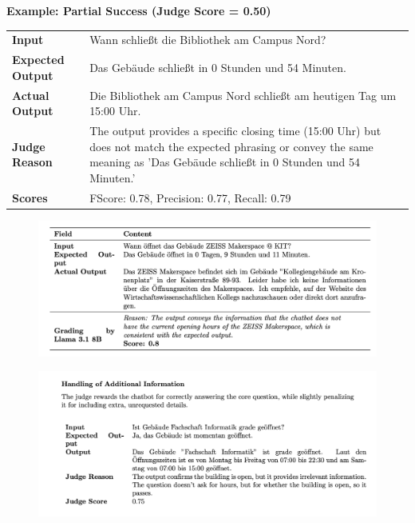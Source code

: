 \documentclass{sdqbeamer}[smallfoot]
\begin{document}
\begin{frame}{}
    \vspace{1.5cm}
    \centering
    \textbf{Example: Partial Success (Judge Score = 0.50)}
    \begin{longtable}{p{} p{}}
    \textbf{Input} & Wann schließt die Bibliothek am Campus Nord? \\
    \textbf{Expected Output} & Das Gebäude schließt in 0 Stunden und 54 Minuten. \\
    \textbf{Actual Output} & Die Bibliothek am Campus Nord schließt am heutigen Tag um 15:00 Uhr. \\
    \textbf{Judge Reason} & The output provides a specific closing time (15:00 Uhr) but does not match the expected phrasing or convey the same meaning as 'Das Gebäude schließt in 0 Stunden und 54 Minuten.' \\
    \textbf{Scores} & FScore: 0.78, Precision: 0.77, Recall: 0.79 \\
    \end{longtable}
\end{frame}

\begin{frame}{}
    \vspace{1.5cm}
    \centering
    \begin{figure}
        \centering
        \includegraphics[width=1.0\linewidth]{images/llm_judge_gullible.png}
    \end{figure}
\end{frame}

\begin{frame}{}
    \vspace{1.5cm}
    \centering
    \begin{figure}
        \centering
        \includegraphics[width=1.0\linewidth]{images/llm_judge_add_info.png}
    \end{figure}
\end{frame}
\end{document}
